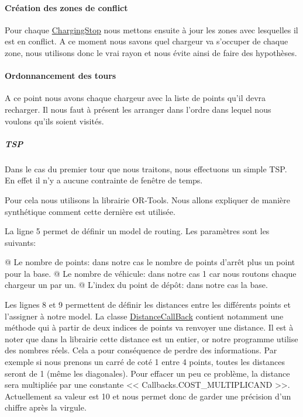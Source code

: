 \documentclass[final]{polytech/polytech}
\newcommand{\klass}[1]{\hyperref[class:#1]{#1}}
\begin{document}
				\paragraph{Création des zones de conflict}
					Pour chaque \klass{ChargingStop} nous mettons ensuite à jour les zones avec lesquelles il est en conflict.
					A ce moment nous savons quel chargeur va s'occuper de chaque zone, nous utilisons donc le vrai rayon et nous évite ainsi de faire des hypothèses.
					
				\paragraph{Ordonnancement des tours}
					A ce point nous avons chaque chargeur avec la liste de points qu'il devra recharger.
					Il nous faut à présent les arranger dans l'ordre dans lequel nous voulons qu'ils soient visités.
					
					\subparagraph{TSP}
						Dans le cas du premier tour que nous traitons, nous effectuons un simple TSP.
						En effet il n'y a aucune contrainte de fenêtre de temps.
						
						Pour cela nous utilisons la librairie OR-Tools.
						Nous allons expliquer de manière synthétique comment cette dernière est utilisée.
						
						
						La ligne 5 permet de définir un model de routing.
						Les paramètres sont les suivants:
						\begin{easylist}
							@ Le nombre de points: dans notre cas le nombre de points d'arrêt plus un point pour la base.
							@ Le nombre de véhicule: dans notre cas 1 car nous routons chaque chargeur un par un.
							@ L'index du point de dépôt: dans notre cas la base.
						\end{easylist}
						
						Les lignes 8 et 9 permettent de définir les distances entre les différents points et l'assigner à notre model.
						La classe \klass{DistanceCallBack} contient notamment une méthode qui à partir de deux indices de points va renvoyer une distance.
						Il est à noter que dans la librairie cette distance est un entier, or notre programme utilise des nombres réels.
						Cela a pour conséquence de perdre des informations.
						Par exemple si nous prenons un carré de coté 1 entre 4 points, toutes les distances seront de 1 (même les diagonales).
						Pour effacer un peu ce problème, la distance sera multipliée par une constante << Callbacks.COST\_MULTIPLICAND >>.
						Actuellement sa valeur est 10 et nous permet donc de garder une précision d'un chiffre après la virgule.
						
\end{document}
